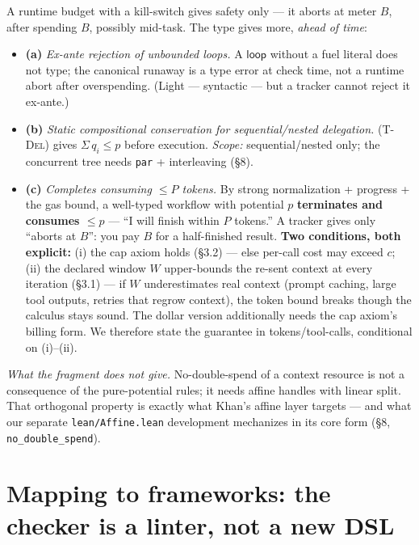 \documentclass[11pt]{article}
\theoremstyle{plain}
\newcommand{\kw}[1]{\mathsf{#1}}                      %
\newcommand{\rul}[1]{\textsc{(#1)}}
\begin{document}
\medskip
A runtime budget with a kill-switch gives safety only --- it aborts at meter $B$, after spending
$B$, possibly mid-task. The type gives more, \emph{ahead of time}:
\begin{itemize}
\item \textbf{(a)} \emph{Ex-ante rejection of unbounded loops.} A $\kw{loop}$ without a fuel
  literal does not type; the canonical runaway is a type error at check time, not a runtime abort
  after overspending. (Light --- syntactic --- but a tracker cannot reject it ex-ante.)
\item \textbf{(b)} \emph{Static compositional conservation for sequential/nested delegation.}
  \rul{T-Del} gives $\Sigma\, q_i \le p$ before execution. \emph{Scope:} sequential/nested only;
  the concurrent tree needs \texttt{par} + interleaving (\S8).
\item \textbf{(c)} \emph{Completes consuming $\le P$ tokens.} By strong normalization + progress +
  the gas bound, a well-typed workflow with potential $p$ \textbf{terminates and consumes $\le p$}
  --- ``I will finish within $P$ tokens.'' A tracker gives only ``aborts at $B$'': you pay $B$ for
  a half-finished result. \textbf{Two conditions, both explicit:} (i) the cap axiom holds (\S3.2)
  --- else per-call cost may exceed $c$; (ii) the declared window $W$ upper-bounds the re-sent
  context at every iteration (\S3.1) --- if $W$ underestimates real context (prompt caching, large
  tool outputs, retries that regrow context), the token bound breaks though the calculus stays
  sound. The dollar version additionally needs the cap axiom's billing form. We therefore state
  the guarantee in tokens/tool-calls, conditional on (i)--(ii).
\end{itemize}

\emph{What the fragment does not give.} No-double-spend of a context resource is not a consequence
of the pure-potential rules; it needs affine handles with linear split. That orthogonal property is
exactly what Khan's affine layer targets --- and what our separate \texttt{lean/Affine.lean}
development mechanizes in its core form (\S8, \texttt{no\_double\_spend}).

\section{Mapping to frameworks: the checker is a linter, not a new DSL}
\end{document}
